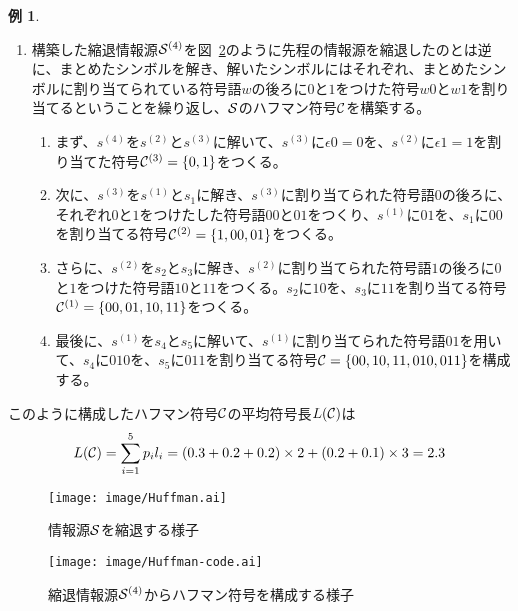 \documentclass[pdflatex, ja=standard, a4paper]{bxjsarticle}
\theoremstyle{definition}
\newtheorem{example}{例}
\newcommand{\figref}[1]{図~\ref{#1}}
\begin{document}
\begin{screen}
\begin{example}
\begin{enumerate}
            \item 構築した縮退情報源$\mathcal{S}^{(4)}$を\figref{fig:construct-huffman-code}のように先程の情報源を縮退したのとは逆に、まとめたシンボルを解き、解いたシンボルにはそれぞれ、まとめたシンボルに割り当てられている符号語$w$の後ろに$0$と$1$をつけた符号$w 0$と$w 1$を割り当てるということを繰り返し、$\mathcal{S}$のハフマン符号$\mathcal{C}$を構築する。
                \begin{enumerate}
                    \item まず、$s^{(4)}$を$s^{(2)}$と$s^{(3)}$に解いて、$s^{(3)}$に$\epsilon 0 = 0$を、$s^{(2)}$に$\epsilon 1 = 1$を割り当てた符号$\mathcal{C}^{(3)} = \{0, 1\}$をつくる。
                    \item 次に、$s^{(3)}$を$s^{(1)}$と$s_1$に解き、$s^{(3)}$に割り当てられた符号語$0$の後ろに、それぞれ$0$と$1$をつけたした符号語$00$と$01$をつくり、$s^{(1)}$に$01$を、$s_1$に$00$を割り当てる符号$\mathcal{C}^{(2)} = \{1, 00, 01\}$をつくる。
                    \item さらに、$s^{(2)}$を$s_2$と$s_3$に解き、$s^{(2)}$に割り当てられた符号語$1$の後ろに$0$と$1$をつけた符号語$10$と$11$をつくる。$s_2$に$10$を、$s_3$に$11$を割り当てる符号$\mathcal{C}^{(1)} = \{00, 01, 10, 11\}$をつくる。
                    \item 最後に、$s^{(1)}$を$s_4$と$s_5$に解いて、$s^{(1)}$に割り当てられた符号語$01$を用いて、$s_4$に$010$を、$s_5$に$011$を割り当てる符号$\mathcal{C} = \{00, 10, 11, 010, 011\}$を構成する。
                \end{enumerate}
        \end{enumerate}

        このように構成したハフマン符号$\mathcal{C}$の平均符号長$L(\mathcal{C})$は
        \begin{align*}
            L(\mathcal{C}) = \sum_{i = 1}^5 p_i l_i = (0.3 + 0.2 + 0.2) \times 2 + (0.2 + 0.1) \times 3 = 2.3
        \end{align*}
    \end{example}
\end{screen}
\begin{figure}
    \centering
    \texttt{[image: image/Huffman.ai]}
    \caption{情報源$\mathcal{S}$を縮退する様子}
    \label{fig:reduce-source}
\end{figure}
\begin{figure}
    \centering
    \texttt{[image: image/Huffman-code.ai]}
    \caption{縮退情報源$\mathcal{S}^{(4)}$からハフマン符号を構成する様子}
    \label{fig:construct-huffman-code}
\end{figure}
\end{document}
